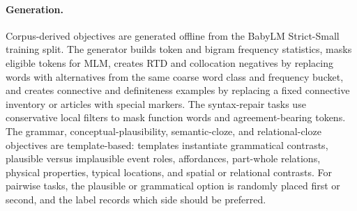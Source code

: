\documentclass[11pt]{article}
\begin{document}
\paragraph{Generation.}
Corpus-derived objectives are generated offline from the BabyLM Strict-Small training split.
The generator builds token and bigram frequency statistics, masks eligible tokens for MLM, creates RTD and collocation negatives by replacing words with alternatives from the same coarse word class and frequency bucket, and creates connective and definiteness examples by replacing a fixed connective inventory or articles with special markers.
The syntax-repair tasks use conservative local filters to mask function words and agreement-bearing tokens.
The grammar, conceptual-plausibility, semantic-cloze, and relational-cloze objectives are template-based: templates instantiate grammatical contrasts, plausible versus implausible event roles, affordances, part-whole relations, physical properties, typical locations, and spatial or relational contrasts.
For pairwise tasks, the plausible or grammatical option is randomly placed first or second, and the label records which side should be preferred.
\end{document}
